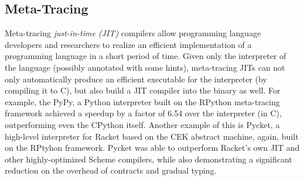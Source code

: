 \subsection{Meta-Tracing}

Meta-tracing \textit{just-in-time (JIT)} compilers allow programming
language developers and researchers to realize an efficient implementation
of a programming language in a short period of time. Given only the 
interpreter of the language (possibly annotated with some hints),
meta-tracing JITs can not only automatically produce an efficient
executable for the interpreter (by compiling it to C), but also build
a JIT compiler into the binary as well. For example, the PyPy, a Python
interpreter built on the RPython meta-tracing framework achieved a
speedup by a factor of 6.54 over the interpreter (in C), outperforming
even the CPython itself. \cite{bolz09} Another example of this is
Pycket, a high-level interpreter for Racket based on the CEK abstract
machine, again, built on the RPtyhon framework. Pycket was able to
outperform Racket's own JIT and other highly-optimized Scheme
compilers, while also demonstrating a significant reduction on the
overhead of contracts and gradual typing. \cite{pycket15}
